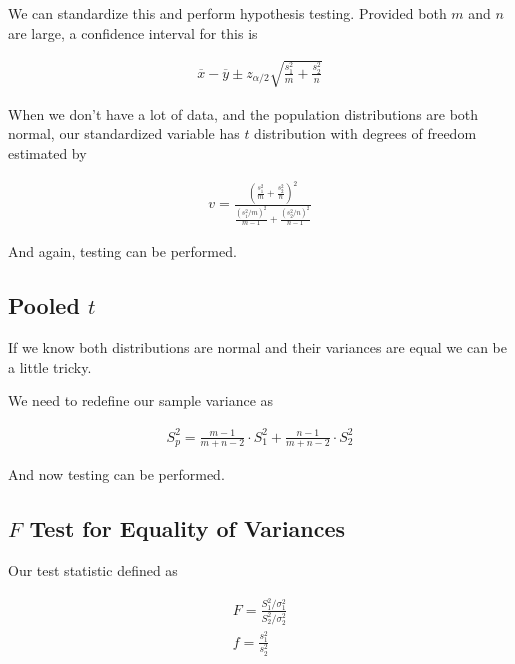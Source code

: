 We can standardize this and perform hypothesis testing. Provided both $m$ and $n$ are large, a confidence interval for
this is

\begin{equation*}
    \begin{aligned}
        \overline{x} - \overline{y} \pm z_{\alpha / 2} \sqrt{\frac{s^2_1}{m} + \frac{s^2_2}{n} }
    \end{aligned}
\end{equation*}

When we don't have a lot of data, and the population distributions are both normal, our standardized variable has $t$
distribution with degrees of freedom estimated by

\begin{equation*}
    \begin{aligned}
        v = \frac{ {\left( \frac{s^2_1}{m} + \frac{s^2_2}{n} \right)}^2}
        {\frac{ {\left( s^2_1 / m \right)}^2}{m - 1} + \frac{ {\left( s^2_2 / n \right)}^2}{n - 1} }
    \end{aligned}
\end{equation*}
    
And again, testing can be performed.

    \subsection{Pooled $t$}
    If we know both distributions are normal and their variances are equal we can be a little tricky.

    We need to redefine our sample variance as

    \begin{equation*}
        \begin{aligned}
            S^2_p = \frac{m - 1}{m + n - 2} \cdot S^2_1 + \frac{n - 1}{m + n - 2} \cdot S^2_2
        \end{aligned}
    \end{equation*}

    And now testing can be performed.

    \subsection{$F$ Test for Equality of Variances}
    Our test statistic defined as

    \begin{equation*}
        \begin{aligned}
            F = \frac{S_1^2 / \sigma^2_1}{S_2^2/\sigma_2^2}\\
            f = \frac{s^2_1}{s^2_2}
        \end{aligned}
    \end{equation*}

